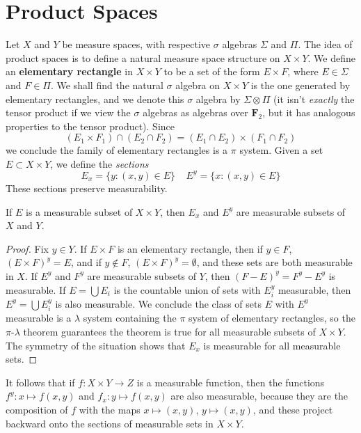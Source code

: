 \chapter{Product Spaces}

Let $X$ and $Y$ be measure spaces, with respective $\sigma$ algebras $\Sigma$ and $\Pi$. The idea of product spaces is to define a natural measure space structure on $X \times Y$. We define an {\bf elementary rectangle} in $X \times Y$ to be a set of the form $E \times F$, where $E \in \Sigma$ and $F \in \Pi$. We shall find the natural $\sigma$ algebra on $X \times Y$ is the one generated by elementary rectangles, and we denote this $\sigma$ algebra by $\Sigma \otimes \Pi$ (it isn't {\it exactly} the tensor product if we view the $\sigma$ algebras as algebras over $\mathbf{F}_2$, but it has analogous properties to the tensor product). Since
%
\[ (E_1 \times F_1) \cap (E_2 \cap F_2) = (E_1 \cap E_2) \times (F_1 \cap F_2) \]
%
we conclude the family of elementary rectangles is a $\pi$ system. Given a set $E \subset X \times Y$, we define the {\it sections}
%
\[ E_x = \{ y: (x,y) \in E \}\ \ \ \ \ E^y = \{ x: (x,y) \in E \} \]
%
These sections preserve measurability.

\begin{lemma}
    If $E$ is a measurable subset of $X \times Y$, then $E_x$ and $E^y$ are measurable subsets of $X$ and $Y$.
\end{lemma}
\begin{proof}
    Fix $y \in Y$. If $E \times F$ is an elementary rectangle, then if $y \in F$, $(E \times F)^y = E$, and if $y \not \in F$, $(E \times F)^y = \emptyset$, and these sets are both measurable in $X$. If $E^y$ and $F^y$ are measurable subsets of $Y$, then $(F - E)^y = F^y - E^y$ is measurable. If $E = \bigcup E_i$ is the countable union of sets with $E_i^y$ measurable, then $E^y = \bigcup E_i^y$ is also measurable. We conclude the class of sets $E$ with $E^y$ measurable is a $\lambda$ system containing the $\pi$ system of elementary rectangles, so the $\pi$-$\lambda$ theorem guarantees the theorem is true for all measurable subsets of $X \times Y$. The symmetry of the situation shows that $E_x$ is measurable for all measurable sets.
\end{proof}

It follows that if $f: X \times Y \to Z$ is a measurable function, then the functions $f^y: x \mapsto f(x,y)$ and $f_x: y \mapsto f(x,y)$ are also measurable, because they are the composition of $f$ with the maps $x \mapsto (x,y)$, $y \mapsto (x,y)$, and these project backward onto the sections of measurable sets in $X \times Y$.


